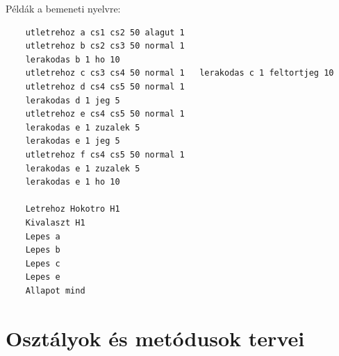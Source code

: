 Példák a bemeneti nyelvre:
\begin{verbatim}
    utletrehoz a cs1 cs2 50 alagut 1
    utletrehoz b cs2 cs3 50 normal 1
    lerakodas b 1 ho 10
    utletrehoz c cs3 cs4 50 normal 1   lerakodas c 1 feltortjeg 10
    utletrehoz d cs4 cs5 50 normal 1
    lerakodas d 1 jeg 5
    utletrehoz e cs4 cs5 50 normal 1
    lerakodas e 1 zuzalek 5
    lerakodas e 1 jeg 5
    utletrehoz f cs4 cs5 50 normal 1
    lerakodas e 1 zuzalek 5
    lerakodas e 1 ho 10

    Letrehoz Hokotro H1
    Kivalaszt H1
    Lepes a
    Lepes b
    Lepes c
    Lepes e
    Allapot mind
\end{verbatim}

\section{Osztályok és metódusok tervei}


